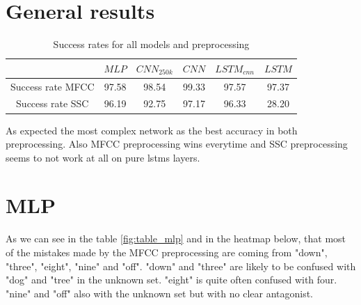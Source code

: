 \section{General results}

\begin{table}[h!]
    \centering
    \begin{tabular}{|c|c|c | c |c |c|}
        
        
        \hline
         & $MLP$ & $CNN_{250k}$ & $CNN$ & $LSTM_{cnn}$ & $LSTM$  \\
        \hline
        Success rate MFCC & 97.58 & 98.54 & 99.33 & 97.57 & 97.37\\
        \hline
        Success rate SSC & 96.19 & 92.75 & 97.17 & 96.33 & 28.20\\
        \hline
    \end{tabular}
    \caption{Success rates for all models and preprocessing}
    \label{tab:genera_modell}
\end{table}

As expected the most complex network as the best accuracy in both preprocessing. Also MFCC preprocessing wins everytime and SSC preprocessing seems to not work at all on pure lstms layers. 



\section{MLP}





As we can see in the table \ref{fig:table_mlp} and in the heatmap below, that most of the mistakes made by the MFCC preprocessing are coming from "down", "three", "eight", "nine" and "off". "down" and "three" are likely to be confused with "dog" and "tree" in the unknown set. "eight" is quite often confused with four. "nine" and "off" also with the unknown set but with no clear antagonist.

